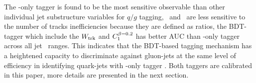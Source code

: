 %
%


The \ntrk-only tagger is found to be the most sensitive observable than other individual jet substructure variables for $q/g$ tagging, 
\wtrk~and \cbeta~are less sensitive to the number of tracks inefficiencies because they are defined as ratios, the BDT-tagger which include the $W_{\mathrm{trk}}$ and $C_{1}^{\beta=0.2}$ has better AUC than \ntrk-only tagger across all jet \pt~ranges. This indicates that the BDT-based tagging mechanism has a heightened capacity to discriminate against gluon-jets at the same level of efficiency in identifying quark-jets with \ntrk-only tagger . Both taggers are calibrated in this paper, more details are presented in the next section.



\FloatBarrier

